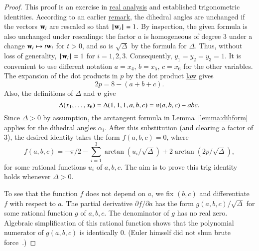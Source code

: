\begin{proof}
  This proof is an exercise in \hyperref[back:analysis]{real analysis}
  and established trigonometric identities.  According to an earlier
  \hyperref[rem:dih]{remark}, the dihedral angles are unchanged if the
  vectors ${\mathbf w}_i$ are rescaled so that ${{\hskip0.1em|\hskip-0.15em|\hskip0.1em}{\mathbf w}_i{\hskip0.1em|\hskip-0.15em|\hskip0.1em}}=1$.  By
  inspection, the given formula is also unchanged under rescalings:
  the factor $a$ is homogeneous of degree $3$ under a change ${\mathbf w}_i
  \mapsto t {\mathbf w}_i$ for $t>0$, and so is $\sqrt{\Delta}$ by the formula
  for $\Delta$.  Thus, without loss of generality, ${{\hskip0.1em|\hskip-0.15em|\hskip0.1em}{\mathbf w}_i{\hskip0.1em|\hskip-0.15em|\hskip0.1em}}=1$ for $i=1,2,3$.  Consequently, $y_1=y_2=y_3=1$.  It is convenient to
  use different notation $a=x_4$, $b=x_5$, $c=x_6$ for the other
  variables. The expansion of the dot products in $p$ by the dot
  product \hyperref[eqn:dot-law]{law} gives
\begin{displaymath}2 p = 8 - (a+b+c).\end{displaymath}
Also, the definitions of $\Delta$ and $\ups$ give
\begin{displaymath}\Delta(x_1,\ldots,x_6) = \Delta(1,1,1,a,b,c) =
\ups(a,b,c) - a b c.\end{displaymath}
Since $\Delta>0$ by assumption, the arctangent formula
in Lemma~\ref{lemma:dihform} 
applies for the dihedral angles $\alpha_i$.  After
this substitution (and clearing a factor of $3$),  %
the desired identity takes the form $f(a,b,c)=0$, where
\begin{displaymath}
f(a,b,c)= -\pi/2 - \sum_{i=1}^3\arctan(u_i/\sqrt{\Delta}) +
2\arctan(2 p/\sqrt{\Delta}),
\end{displaymath}
for some rational functions $u_i$ of $a,b,c$.  The aim is to prove
this trig identity holds whenever $\Delta>0$.

To see that the function $f$ does not depend on $a$, 
we fix $(b,c)$ and differentiate $f$ with respect to $a$.  The partial
derivative $\partial f/\partial a$ has the form
$g(a,b,c)/\sqrt{\Delta}$ for some rational function $g$ of $a,b,c$.
The denominator of $g$ has no real zero.  Algebraic simplification of
this rational function shows that the polynomial numerator of
$g(a,b,c)$ is identically $0$.  (Euler himself did not shun brute
force~\cite{Euler}.)


\end{proof}
